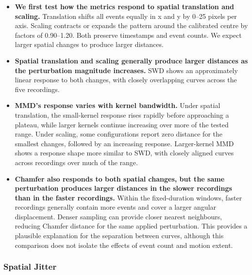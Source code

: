 \begin{itemize}

    \item  \textbf{We first test how the metrics respond to spatial translation and scaling.} Translation shifts all events equally in x and y by 0–25 pixels per axis. Scaling contracts or expands the pattern around the calibrated centre by factors of 0.90–1.20. Both preserve timestamps and event counts. We expect larger spatial changes to produce larger distances.

    \item  \textbf{Spatial translation and scaling generally produce larger distances as the perturbation magnitude increases.} SWD shows an approximately linear response to both changes, with closely overlapping curves across the five recordings.

    \item \textbf{MMD’s response varies with kernel bandwidth.} Under spatial translation, the small-kernel response rises rapidly before approaching a plateau, while larger kernels continue increasing over more of the tested range. Under scaling, some configurations report zero distance for the smallest changes, followed by an increasing response. Larger-kernel MMD shows a response shape more similar to SWD, with closely aligned curves across recordings over much of the range.

    \item \textbf{Chamfer also responds to both spatial changes, but the same perturbation produces larger distances in the slower recordings than in the faster recordings.} Within the fixed-duration windows, faster recordings generally contain more events and cover a larger angular displacement. Denser sampling can provide closer nearest neighbours, reducing Chamfer distance for the same applied perturbation. This provides a plausible explanation for the separation between curves, although this comparison does not isolate the effects of event count and motion extent.
    
\end{itemize}


\subsubsection{Spatial Jitter}

